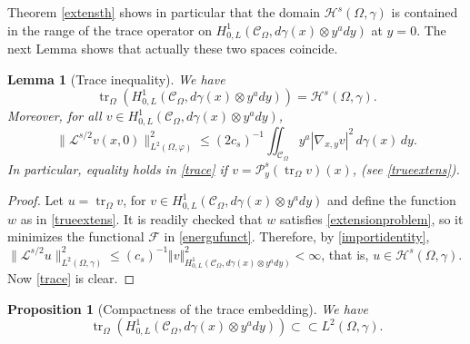 \documentclass[a4paper,10pt,reqno]{amsart}
\newcommand{\tr}{\operatorname{tr}}
\newtheorem{lemma}[theorem]{Lemma}
\newtheorem{proposition}[theorem]{Proposition}
\numberwithin{equation}{section}
\begin{document}
Theorem \ref{extensth} shows in particular that the domain
$\mathcal{H}^s(\Omega,\gamma)$ is contained in the range of the trace operator
on $H_{0,L}^{1}(\mathcal{C}_{\Omega},d\gamma(x)\otimes y^ady)$ at $y=0$. The next Lemma
shows that actually these two spaces coincide.

\begin{lemma}[Trace inequality]\label{Identification}
We have
\[
\operatorname{tr}_{\Omega}(H_{0,L}^{1}(\mathcal{C}_{\Omega},d\gamma(x)\otimes
y^ady))=\mathcal{H}^s(\Omega,\gamma).
\]
Moreover, for all $v\in H^{1}_{0,L}(\mathcal{C}_{\Omega},d\gamma(x)\otimes y^ady)$,
\begin{equation}\label{trace}
\|\mathcal{L}^{s/2}v(x,0)\|_{L^{2}(\Omega,\varphi)}^2 \leq (2c_s)^{-1}
\iint_{\mathcal{C}_{\Omega}}
y^a|\nabla_{x,y}v|^{2}\,d\gamma(x)\,dy.
\end{equation}
In particular, equality holds in \eqref{trace} if $v=\mathcal{P}_y^s(\operatorname{tr}_{\Omega}v)(x)$,
(see \eqref{trueextens}).
\end{lemma}

\begin{proof}
Let $u=\tr_\Omega v$, for $v\in H_{0,L}^{1}(\mathcal{C}_{\Omega
},d\gamma(x)\otimes y^ady)$ and define the function $w$ as in \eqref{trueextens}.
It is readily checked that $w$ satisfies \eqref{extensionproblem}, so it minimizes the functional $\mathcal{F}$ in \eqref{energufunct}. Therefore, by \eqref{importidentity},
$\|\mathcal{L}^{s/2}u\|^{2}_{L^{2}(\Omega,\gamma)}\leq (c_s)^{-1}\Vert
v\Vert_{H_{0,L}^{1}(\mathcal{C}_{\Omega},d\gamma(x)\otimes y^ady)}^{2}<\infty$,
that is, $u\in\mathcal{H}^s(\Omega,\gamma)$. Now \eqref{trace} is clear.
\end{proof}

\begin{proposition}[Compactness of the trace embedding]\label{compactness}We have
\[
\operatorname{tr}_{\Omega}(H_{0,L}^{1}(\mathcal{C}_{\Omega},d\gamma(x)\otimes
y^ady))\subset\subset L^{2}(\Omega,\gamma).
\]
\end{proposition}
\end{document}
